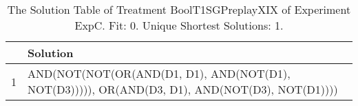 \begin{table}[ht]
\centering
\begin{tabular}{rp{9cm}}
  \hline
 & Solution \\ 
  \hline
1 & AND(NOT(NOT(OR(AND(D1, D1), AND(NOT(D1), NOT(D3))))), OR(AND(D3, D1), AND(NOT(D3), NOT(D1)))) \\ 
   \hline
\end{tabular}
\caption{The Solution Table of Treatment BoolT1SGPreplayXIX of Experiment ExpC. Fit: 0. Unique Shortest Solutions: 1.} 
\end{table}
